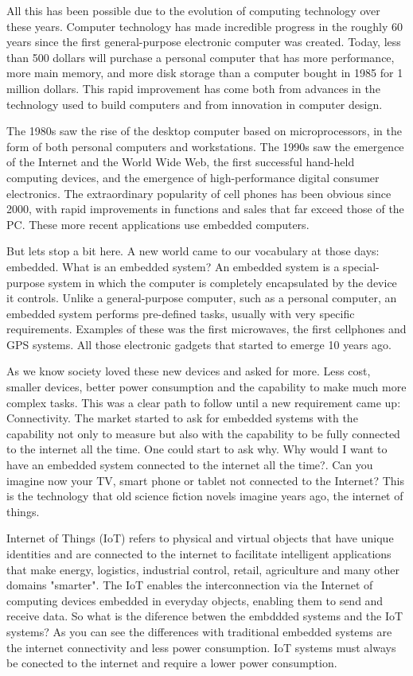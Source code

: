 All this has been possible due to the evolution of computing technology over
these years. Computer technology has made incredible progress in the roughly 60
years since the first general-purpose electronic computer was created. Today,
less than 500 dollars  will purchase a personal computer that has more
performance, more main memory, and more disk storage than a computer bought in
1985 for 1 million dollars.\cite{Hennessy} This rapid improvement has come both
from advances in the technology used to build computers and from innovation in
computer design.

The 1980s saw the rise of the desktop computer based on microprocessors, in the
form of both personal computers and workstations. The 1990s saw the emergence
of the Internet and the World Wide Web, the first successful hand-held computing
devices, and the emergence of high-performance digital consumer electronics.
The extraordinary popularity of cell phones has been obvious since 2000, with
rapid improvements in functions and sales that far exceed those of the PC.
These more recent applications use embedded computers.

But lets stop a bit here. A new world came to our vocabulary at those days:
embedded. What is an embedded system? An embedded system is a special-purpose
system in which the computer is completely encapsulated by the device it
controls.\cite{Hallinan} Unlike a general-purpose computer, such as a personal
computer, an embedded system performs pre-defined tasks, usually with very
specific requirements. Examples of these was the first microwaves, the first
cellphones and GPS systems. All those electronic gadgets that started to emerge
10 years ago.

As we know society loved these new devices and asked for more. Less cost, 
smaller devices, better power consumption and the capability to make much more
complex tasks. This was a clear path to follow until a new requirement came up:
Connectivity. The market started to ask for embedded systems with the capability
not only to measure but also with the capability to be fully connected to the
internet all the time. One could start to ask why. Why would I want to have an
embedded system connected to the internet all the time?. Can you imagine now
your TV, smart phone or tablet not connected to the Internet? This is the
technology that old science fiction novels imagine years ago, the internet of
things.

Internet of Things (IoT) refers to physical and virtual objects that have
unique identities and are connected to the internet to facilitate intelligent
applications that make energy, logistics, industrial control, retail,
agriculture and many other domains "smarter".\cite{Bahga} The IoT enables the
interconnection via the Internet of computing devices embedded in everyday
objects, enabling them to send and receive data. So what is the diference
betwen the embddded systems and the IoT systems? As you can see the differences
with traditional embedded systems are the internet connectivity and less power
consumption. IoT systems must always be conected to the internet and require a
lower power consumption.

